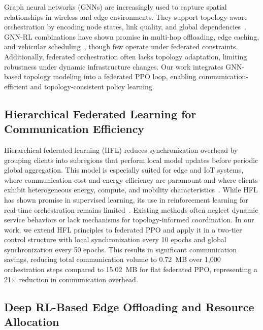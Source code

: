 \documentclass[conference]{IEEEtran}
\begin{document}
	Graph neural networks (GNNs) are increasingly used to capture spatial relationships in wireless and edge environments. They support topology-aware orchestration by encoding node states, link quality, and global dependencies~\cite{zhang2024optimizing,jere2023distributed}. GNN-RL combinations have shown promise in multi-hop offloading, edge caching, and vehicular scheduling~\cite{makris2024gnnrl,hao2021urllc}, though few operate under federated constraints. Additionally, federated orchestration often lacks topology adaptation, limiting robustness under dynamic infrastructure changes. Our work integrates GNN-based topology modeling into a federated PPO loop, enabling communication-efficient and topology-consistent policy learning.
	
	
	\subsection{Hierarchical Federated Learning for Communication Efficiency}
	
	Hierarchical federated learning (HFL) reduces synchronization overhead by grouping clients into subregions that perform local model updates before periodic global aggregation. This model is especially suited for edge and IoT systems, where communication cost and energy efficiency are paramount and where clients exhibit heterogeneous energy, compute, and mobility characteristics~\cite{tan2023selfadaptive,huang2022workercentric}. While HFL has shown promise in supervised learning, its use in reinforcement learning for real-time orchestration remains limited~\cite{tam2025graph}. Existing methods often neglect dynamic service behaviors or lack mechanisms for topology-informed coordination. In our work, we extend HFL principles to federated PPO and apply it in a two-tier control structure with local synchronization every 10 epochs and global synchronization every 50 epochs. This results in significant communication savings, reducing total communication volume to 0.72~MB over 1{,}000 orchestration steps compared to 15.02~MB for flat federated PPO, representing a 21$\times$ reduction in communication overhead.
	
	
	\subsection{Deep RL-Based Edge Offloading and Resource Allocation}
	
\end{document}
